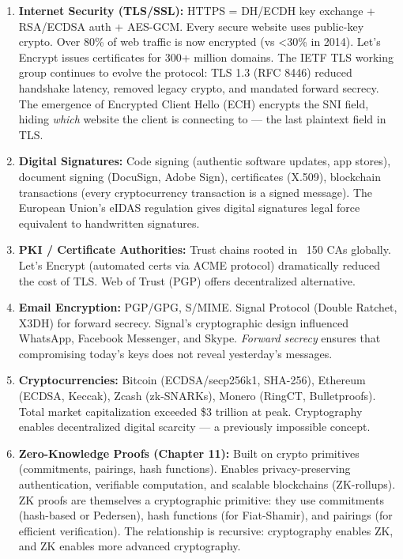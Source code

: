 \begin{enumerate}
\item \textbf{Internet Security (TLS/SSL):} HTTPS = DH/ECDH key exchange + RSA/ECDSA auth + AES-GCM. Every secure website uses public-key crypto. Over 80\% of web traffic is now encrypted (vs \textless 30\% in 2014). Let's Encrypt issues certificates for 300+ million domains. The IETF TLS working group continues to evolve the protocol: TLS 1.3 (RFC 8446) reduced handshake latency, removed legacy crypto, and mandated forward secrecy. The emergence of Encrypted Client Hello (ECH) encrypts the SNI field, hiding \emph{which} website the client is connecting to — the last plaintext field in TLS.

\item \textbf{Digital Signatures:} Code signing (authentic software updates, app stores), document signing (DocuSign, Adobe Sign), certificates (X.509), blockchain transactions (every cryptocurrency transaction is a signed message). The European Union's eIDAS regulation gives digital signatures legal force equivalent to handwritten signatures.

\item \textbf{PKI / Certificate Authorities:} Trust chains rooted in ~150 CAs globally. Let's Encrypt (automated certs via ACME protocol) dramatically reduced the cost of TLS. Web of Trust (PGP) offers decentralized alternative.

\item \textbf{Email Encryption:} PGP/GPG, S/MIME. Signal Protocol (Double Ratchet, X3DH) for forward secrecy. Signal's cryptographic design influenced WhatsApp, Facebook Messenger, and Skype. \emph{Forward secrecy} ensures that compromising today's keys does not reveal yesterday's messages.

\item \textbf{Cryptocurrencies:} Bitcoin (ECDSA/secp256k1, SHA-256), Ethereum (ECDSA, Keccak), Zcash (zk-SNARKs), Monero (RingCT, Bulletproofs). Total market capitalization exceeded \$3 trillion at peak. Cryptography enables decentralized digital scarcity — a previously impossible concept.

\item \textbf{Zero-Knowledge Proofs (Chapter 11):} Built on crypto primitives (commitments, pairings, hash functions). Enables privacy-preserving authentication, verifiable computation, and scalable blockchains (ZK-rollups). ZK proofs are themselves a cryptographic primitive: they use commitments (hash-based or Pedersen), hash functions (for Fiat-Shamir), and pairings (for efficient verification). The relationship is recursive: cryptography enables ZK, and ZK enables more advanced cryptography.


\end{enumerate}
